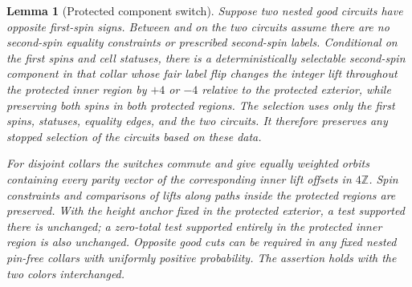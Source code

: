 \documentclass[11pt]{article}
\newtheorem{lemma}[theorem]{Lemma}
\theoremstyle{definition}
\theoremstyle{remark}
\numberwithin{equation}{section}
\begin{document}
\begin{lemma}[Protected component switch]\label{lem:collar-switch}
Suppose two nested good circuits have opposite first-spin signs. Between
and on the two circuits assume there are no second-spin equality
constraints or prescribed second-spin labels. Conditional on the
first spins and cell statuses, there is a deterministically selectable
second-spin component in that collar whose fair label flip changes the
integer lift throughout the protected inner region by $+4$ or $-4$
relative to the protected exterior, while preserving both spins in both
protected regions. The selection uses only the first spins, statuses,
equality edges, and the two circuits. It therefore preserves any stopped
selection of the circuits based on these data.

For disjoint collars the switches commute and give equally weighted
orbits containing every parity vector of the corresponding inner lift
offsets in $4\mathbb Z$. Spin constraints and comparisons of lifts along paths
inside the protected regions are preserved. With the height anchor fixed
in the protected exterior, a test supported there is unchanged; a
zero-total test supported entirely in the protected inner region is also
unchanged. Opposite good cuts can be required in any
fixed nested pin-free collars with uniformly positive probability.
The assertion holds with the two colors interchanged.
\end{lemma}
\end{document}
